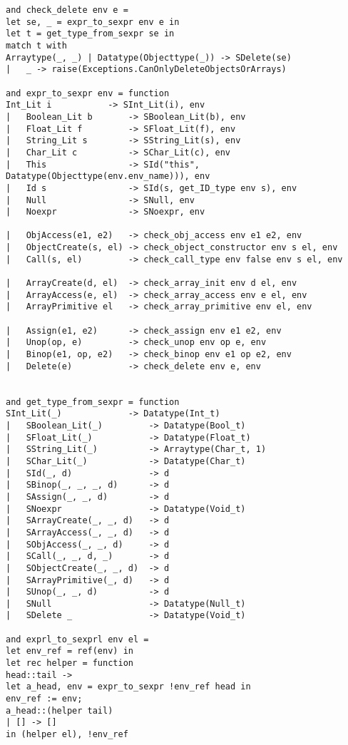 \begin{verbatim}
and check_delete env e = 
let se, _ = expr_to_sexpr env e in
let t = get_type_from_sexpr se in
match t with
Arraytype(_, _) | Datatype(Objecttype(_)) -> SDelete(se)
| 	_ -> raise(Exceptions.CanOnlyDeleteObjectsOrArrays)

and expr_to_sexpr env = function
Int_Lit i           -> SInt_Lit(i), env
|   Boolean_Lit b       -> SBoolean_Lit(b), env
|   Float_Lit f         -> SFloat_Lit(f), env
|   String_Lit s        -> SString_Lit(s), env
|   Char_Lit c          -> SChar_Lit(c), env
|   This                -> SId("this", Datatype(Objecttype(env.env_name))), env
|   Id s                -> SId(s, get_ID_type env s), env
|   Null                -> SNull, env
|   Noexpr              -> SNoexpr, env

|   ObjAccess(e1, e2)   -> check_obj_access env e1 e2, env
|   ObjectCreate(s, el) -> check_object_constructor env s el, env
|   Call(s, el)         -> check_call_type env false env s el, env

|   ArrayCreate(d, el)  -> check_array_init env d el, env
|   ArrayAccess(e, el)  -> check_array_access env e el, env
|   ArrayPrimitive el   -> check_array_primitive env el, env

|   Assign(e1, e2)      -> check_assign env e1 e2, env
|   Unop(op, e)         -> check_unop env op e, env
|   Binop(e1, op, e2)   -> check_binop env e1 op e2, env
| 	Delete(e) 			-> check_delete env e, env


and get_type_from_sexpr = function
SInt_Lit(_)				-> Datatype(Int_t)
| 	SBoolean_Lit(_)			-> Datatype(Bool_t)
| 	SFloat_Lit(_)			-> Datatype(Float_t)
| 	SString_Lit(_) 			-> Arraytype(Char_t, 1)
| 	SChar_Lit(_) 			-> Datatype(Char_t)
| 	SId(_, d) 				-> d
| 	SBinop(_, _, _, d) 		-> d
| 	SAssign(_, _, d) 		-> d
| 	SNoexpr 				-> Datatype(Void_t)
| 	SArrayCreate(_, _, d)	-> d
| 	SArrayAccess(_, _, d) 	-> d
| 	SObjAccess(_, _, d)		-> d
| 	SCall(_, _, d, _)		-> d
|   SObjectCreate(_, _, d) 	-> d
| 	SArrayPrimitive(_, d)	-> d
|  	SUnop(_, _, d) 			-> d
| 	SNull					-> Datatype(Null_t)
| 	SDelete _ 				-> Datatype(Void_t)

and exprl_to_sexprl env el =
let env_ref = ref(env) in
let rec helper = function
head::tail ->
let a_head, env = expr_to_sexpr !env_ref head in
env_ref := env;
a_head::(helper tail)
| [] -> []
in (helper el), !env_ref


\end{verbatim}
